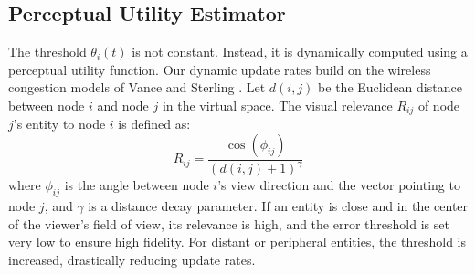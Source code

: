 \subsection{Perceptual Utility Estimator}
The threshold $\theta_i(t)$ is not constant. Instead, it is dynamically computed using a perceptual utility function. Our dynamic update rates build on the wireless congestion models of Vance and Sterling \cite{vance2024adaptive}. Let $d(i, j)$ be the Euclidean distance between node $i$ and node $j$ in the virtual space. The visual relevance $R_{ij}$ of node $j$'s entity to node $i$ is defined as:
\[
  R_{ij} = \frac{\cos(\phi_{ij})}{(d(i, j) + 1)^\gamma}
\]
where $\phi_{ij}$ is the angle between node $i$'s view direction and the vector pointing to node $j$, and $\gamma$ is a distance decay parameter. If an entity is close and in the center of the viewer's field of view, its relevance is high, and the error threshold is set very low to ensure high fidelity. For distant or peripheral entities, the threshold is increased, drastically reducing update rates.
